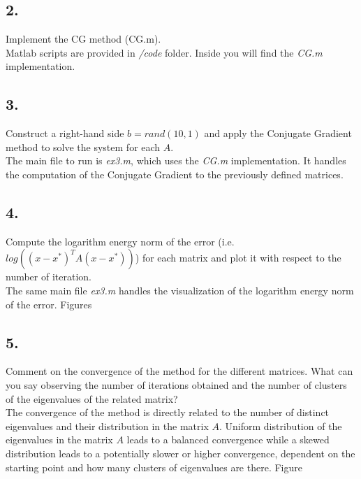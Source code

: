 \documentclass[unicode,11pt,a4paper,oneside,numbers=endperiod,openany]{scrartcl}
\begin{document}
\subsection*{2.}
Implement the CG method (CG.m).\\

Matlab scripts are provided in \textit{/code} folder.
Inside you will find the \textit{CG.m} implementation.

\subsection*{3.}
Construct a right-hand side $b = rand(10,1)$
and apply the Conjugate Gradient method to solve the system for each $A$.\\

The main file to run is \textit{ex3.m}, which uses the \textit{CG.m} implementation.
It handles the computation of the Conjugate Gradient to the previously defined matrices.

\subsection*{4.}
Compute the logarithm energy norm of the error (i.e. $log((x - x^*)^T A(x - x^*))$)
for each matrix and plot it with respect to the number of iteration.\\

The same main file \textit{ex3.m} handles the visualization of the logarithm energy norm
of the error.
Figures %

\subsection*{5.}
Comment on the convergence of the method for the different matrices.
What can you say observing the number of iterations obtained
and the number of clusters of the eigenvalues of the related matrix?\\

The convergence of the method is directly related to the number of distinct eigenvalues
and their distribution in the matrix $A$.
Uniform distribution of the eigenvalues in the matrix $A$ leads to a balanced convergence
while a skewed distribution leads to a potentially slower or higher convergence,
dependent on the starting point and how many clusters of eigenvalues are there.
Figure %

\clearpage
\end{document}
